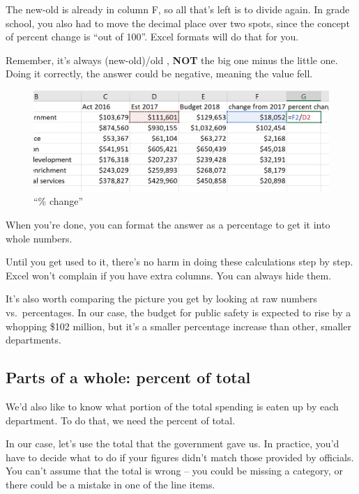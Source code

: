 \documentclass[
  letterpaper,
  DIV=11,
  numbers=noendperiod]{scrreprt}
\begin{document}
The new-old is already in column F, so all that's left is to divide
again. In grade school, you also had to move the decimal place over two
spots, since the concept of percent change is ``out of 100''. Excel
formats will do that for you.

Remember, it's always (new-old)/old , \textbf{NOT} the big one minus the
little one. Doing it correctly, the answer could be negative, meaning
the value fell.

\begin{figure}

{\centering \includegraphics[width=1\textwidth,height=\textheight]{./images/xl_mathreview_04.png}

}

\caption{``\% change''}

\end{figure}

When you're done, you can format the answer as a percentage to get it
into whole numbers.

Until you get used to it, there's no harm in doing these calculations
step by step. Excel won't complain if you have extra columns. You can
always hide them.

It's also worth comparing the picture you get by looking at raw numbers
vs.~percentages. In our case, the budget for public safety is expected
to rise by a whopping \$102 million, but it's a smaller percentage
increase than other, smaller departments.

\hypertarget{parts-of-a-whole-percent-of-total}{%
\subsection{Parts of a whole: percent of
total}\label{parts-of-a-whole-percent-of-total}}

We'd also like to know what portion of the total spending is eaten up by
each department. To do that, we need the percent of total.

In our case, let's use the total that the government gave us. In
practice, you'd have to decide what to do if your figures didn't match
those provided by officials. You can't assume that the total is wrong --
you could be missing a category, or there could be a mistake in one of
the line items.
\end{document}
